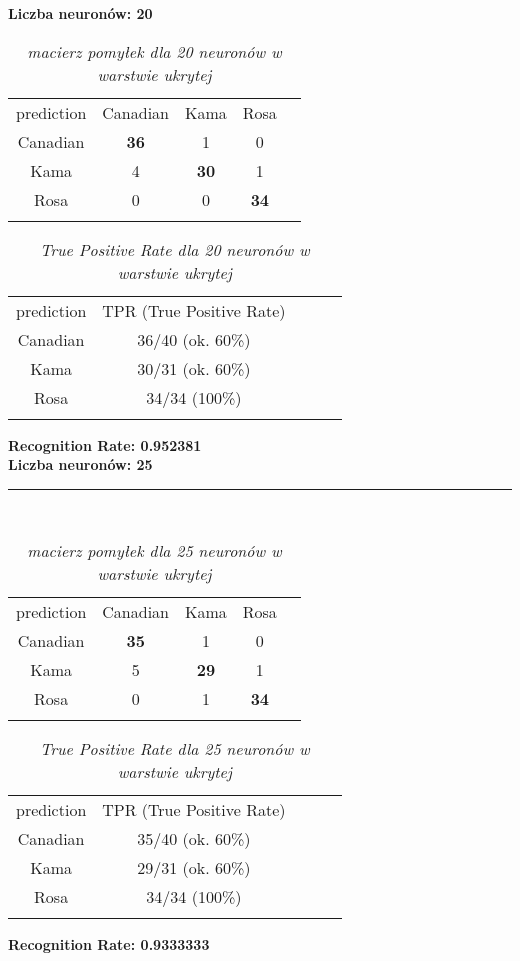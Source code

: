 \documentclass[a4paper,12pt]{article}
\newcommand{\linia}{\rule{\linewidth}{0.5pt}}
\theoremstyle{mytheor}
\begin{document}
\textbf{Liczba neuronów: 20}\\

\begin{table}[H]
\begin{tabular}{ccccc}
prediction & Canadian & Kama & Rosa  &  \\
Canadian & \textbf{36} & 1 & 0 &  \\
Kama & 4 & \textbf{30} & 1 &  \\
Rosa & 0 & 0 & \textbf{34} &  \\
&&&& 
\end{tabular}
\caption{\textit{macierz pomyłek dla 20 neuronów w warstwie ukrytej}}
\label{tab:7}
\end{table}
\begin{table}[H]
\begin{tabular}{ccccc}
prediction & TPR (True Positive Rate) &  \\
Canadian & 36/40 (ok. 60\%) & \\
Kama & 30/31 (ok. 60\%) & \\
Rosa & 34/34 (100\%) & \\
&&
\end{tabular}
\caption{\textit{True Positive Rate dla 20 neuronów w warstwie ukrytej}}
\label{tab:8}
\end{table}
\textbf{Recognition Rate: 0.952381} \\

\textbf{Liczba neuronów: 25}\\
\linia\\

\begin{table}[H]
\begin{tabular}{ccccc}
prediction & Canadian & Kama & Rosa  &  \\
Canadian & \textbf{35} & 1 & 0 &  \\
Kama & 5 & \textbf{29} & 1 &  \\
Rosa & 0 & 1 & \textbf{34} &  \\
&&&& 
\end{tabular}
\caption{\textit{macierz pomyłek dla 25 neuronów w warstwie ukrytej}}
\label{tab:9}
\end{table}
\begin{table}[H]
\begin{tabular}{ccccc}
prediction & TPR (True Positive Rate) &  \\
Canadian & 35/40 (ok. 60\%) & \\
Kama & 29/31 (ok. 60\%) & \\
Rosa & 34/34 (100\%) & \\
&&
\end{tabular}
\caption{\textit{True Positive Rate dla 25 neuronów w warstwie ukrytej}}
\label{tab:10}
\end{table}
\textbf{Recognition Rate: 0.9333333}
\end{document}
